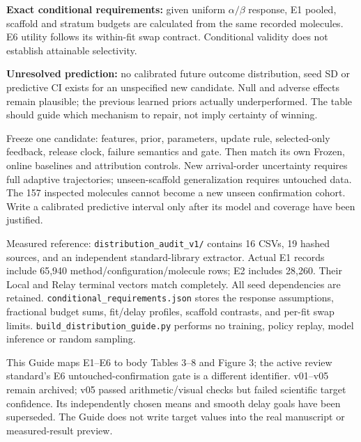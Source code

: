 \documentclass[10pt,letterpaper]{article}
\newcommand{\note}[1]{{\fontsize{8.5}{10.5}\selectfont #1\par}}
\newcommand{\sect}[1]{\vspace{5pt}{\large\bfseries #1}\par\vspace{2pt}}
\begin{document}
\textbf{Exact conditional requirements:} given uniform $\alpha/\beta$ response, E1 pooled,
scaffold and stratum budgets are calculated from the same recorded molecules. E6 utility follows its
within-fit swap contract. Conditional validity does not establish attainable selectivity.

\textbf{Unresolved prediction:} no calibrated future outcome distribution, seed SD or predictive CI exists
for an unspecified new candidate. Null and adverse effects remain plausible; the previous learned
priors actually underperformed. The table should guide which mechanism to repair, not imply certainty of winning.

\sect{Before filling a prospective result matrix}
Freeze one candidate: features, prior, parameters, update rule, selected-only feedback, release clock,
failure semantics and gate. Then match its own Frozen, online baselines and attribution controls.
New arrival-order uncertainty requires full adaptive trajectories; unseen-scaffold generalization requires
untouched data. The 157 inspected molecules cannot become a new unseen confirmation cohort.
Write a calibrated predictive interval only after its model and coverage have been justified.

\sect{Evidence and reproducibility}
\note{\raggedright Measured reference: \texttt{distribution\_audit\_v1/} contains 16 CSVs, 19 hashed sources,
and an independent standard-library extractor. Actual E1 records include 65,940 method/configuration/molecule rows;
E2 includes 28,260. Their Local and Relay terminal vectors match completely.
All seed dependencies are retained. \texttt{conditional\_requirements.json} stores the response assumptions,
fractional budget sums, fit/delay profiles, scaffold contrasts, and per-fit swap limits.
\texttt{build\_distribution\_guide.py} performs no training, policy replay, model inference or random sampling.}

\note{This Guide maps E1--E6 to body Tables 3--8 and Figure 3; the active review standard's E6
untouched-confirmation gate is a different identifier. v01--v05 remain archived; v05 passed arithmetic/visual
checks but failed scientific target confidence. Its independently chosen means and smooth delay goals have
been superseded. The Guide does not write target values into the real manuscript or measured-result preview.}
\end{document}
